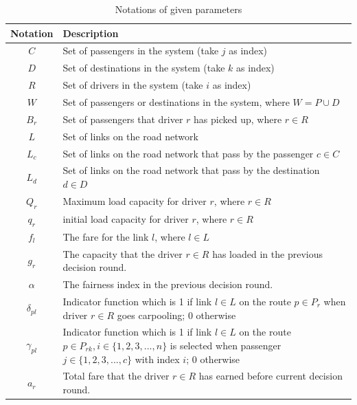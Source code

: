 \renewcommand\arraystretch{1.5}
\par
\begin{table}[ht]
  \centering
  \caption{Notations of given parameters}
  \begin{tabularx}{\textwidth}{cX}
  \toprule
  Notation & Description \\
  \midrule
    $C$ & Set of passengers in the system (take $j$ as index) \\
    $D$ & Set of destinations in the system (take $k$ as index) \\
    $R$ & Set of drivers in the system (take $i$ as index) \\
    $W$ & Set of passengers or destinations in the system, where $W = P \cup D$ \\
    $B_r$ & Set of passengers that driver $r$ has picked up, where $r \in R$ \\
    $L$ & Set of links on the road network \\
    $L_c$ & Set of links on the road network that pass by the passenger $c \in C$ \\
    $L_d$ & Set of links on the road network that pass by the destination $d \in D$ \\
    $Q_r$ & Maximum load capacity for driver $r$, where $r \in R$ \\
    $q_r$ & initial load capacity for driver $r$, where $r \in R$ \\
    $f_l$ & The fare for the link $l$, where $l \in L$ \\
    $g_r$ & The capacity that the driver $r \in R$ has loaded in the previous decision round. \\
    $\alpha$ & The fairness index in the previous decision round. \\
    $\delta_{pl}$ & Indicator function which is 1 if link $l \in L$ on the route $p \in P_r$ when driver $r \in R$ goes carpooling; 0 otherwise \\
    $\gamma_{pl}$ & Indicator function which is 1 if link $l \in L$ on the route $p \in P_{rk}, i \in \{1,2,3,...,n\}$ is selected when passenger $j \in \{1,2,3,...,c\}$ with index $i$; 0 otherwise \\
    $a_r$ & Total fare that the driver $r \in R$ has earned before current decision round. \\
  \bottomrule
  \end{tabularx}
\end{table}  
\par

